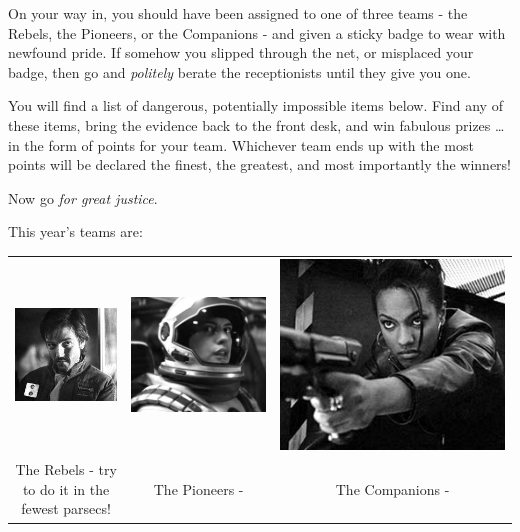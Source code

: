 On your way in, you should have been assigned to one of three teams - the Rebels, the Pioneers, or the Companions
- and given a sticky badge to wear with newfound pride.
If somehow you slipped through the net,
or misplaced your badge,
then go and \emph{politely} berate the receptionists until they give you one.

You will find a list of dangerous, potentially impossible items below.
Find any of these items, bring the evidence back to the front desk, and win fabulous prizes \ldots in the form of points for your team.
Whichever team ends up with the most points will be declared the finest, the greatest, and most importantly the winners!

Now go \emph{for great justice}.

This year's teams are:

\begin{tabular}{ccc}
	\includegraphics[width=0.2\columnwidth]{pictures/cassian} &
	\includegraphics[width=0.2\columnwidth]{pictures/hathaway} &
	\includegraphics[width=0.2\columnwidth]{pictures/martha} \\

	\parbox{0.3\textwidth}{\center\large The Rebels - try to do it in the fewest parsecs!} &
	\parbox{0.3\textwidth}{\center\large The Pioneers -  } &
	\parbox{0.3\textwidth}{\center\large The Companions - } \\
\end{tabular}
\vspace{5mm}

